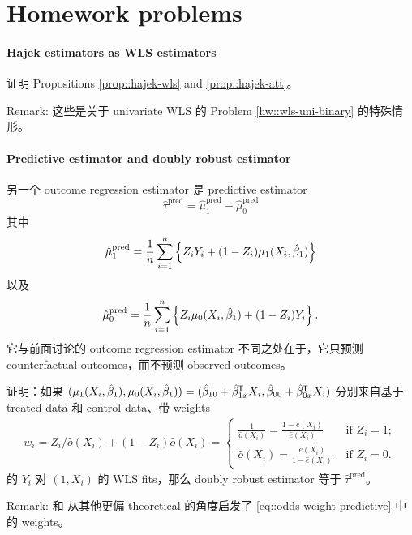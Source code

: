 \section{Homework problems}

\paragraph{Hajek estimators as WLS estimators}\label{hw::ate-hajek-wls}

证明 Propositions \ref{prop::hajek-wls} and \ref{prop::hajek-att}。

Remark: 这些是关于 univariate WLS 的 Problem \ref{hw::wls-uni-binary} 的特殊情形。

 
\paragraph{Predictive estimator and doubly robust estimator}\label{hw::dr-projective-estimator}

另一个 outcome regression estimator 是 predictive estimator
$$
\hat{\tau}^\text{pred} = 
\hat{\mu}_1^\text{pred} - \hat{\mu}_0^\text{pred} 
$$
其中
$$
\hat{\mu}_1^\text{pred} = 
\frac{1}{n} \sum_{i=1}^n \left\{  Z_i Y_i + (1-Z_i)  \mu_1(X_i, \hat{\beta}_1)   \right\}
$$
以及
$$
\hat{\mu}_0^\text{pred}  = 
\frac{1}{n} \sum_{i=1}^n \left\{  Z_i \mu_0(X_i, \hat{\beta}_1) + (1-Z_i) Y_i  \right\} .
$$
它与前面讨论的 outcome regression estimator 不同之处在于，它只预测 counterfactual outcomes，而不预测 observed outcomes。

证明：如果 $(\mu_1(X_i, \hat{\beta}_1), \mu_0(X_i, \hat{\beta}_1) ) =  
( \hat \beta_{10} +   \hat \beta_{1x}^{\mkern-1.5mu\mathsf{T}} X_i, \hat \beta_{00} +   \hat\beta_{0x}^{\mkern-1.5mu\mathsf{T}} X_i)$ 分别来自基于 treated data 和 control data、带 weights
\begin{eqnarray}
\label{eq::odds-weight-predictive}
w_i =  Z_i/\hat{o}(X_i) + (1-Z_i) \hat{o}(X_i)
= \begin{cases}
\frac{1}{\hat{o}(X_i)} = \frac{ 1-  \hat{e}(X_i) }{ \hat{e}(X_i) } & \text{ if } Z_i=1;\\
 \hat{o}(X_i) = \frac{  \hat{e}(X_i)  }{ 1-\hat{e}(X_i)} & \text{ if } Z_i=0.
\end{cases} 
\end{eqnarray}
的 $Y_i$ 对 $(1, X_i)$ 的 WLS fits，那么 doubly robust estimator 等于 $\hat{\tau}^\text{pred} $。

Remark: 
\citet{cao2009improving} 和 \citet{vermeulen2015bias} 从其他更偏 theoretical 的角度启发了 \eqref{eq::odds-weight-predictive} 中的 weights。



